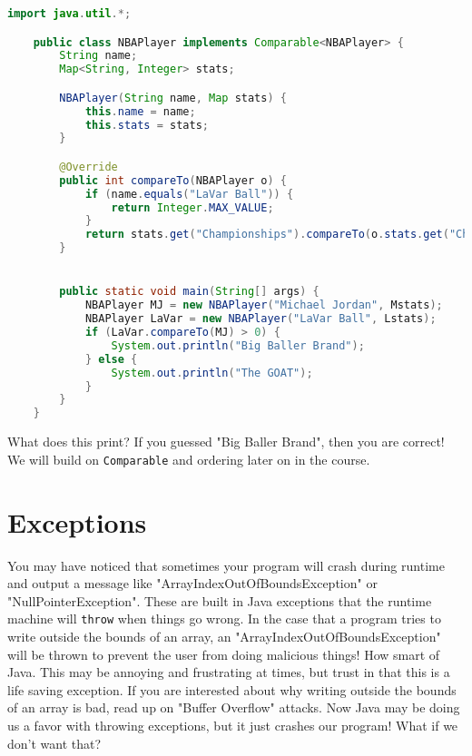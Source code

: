 \documentclass{article}
\begin{document}
    \begin{lstlisting}[language=Java]
    import java.util.*;

    public class NBAPlayer implements Comparable<NBAPlayer> {
        String name;
        Map<String, Integer> stats;

        NBAPlayer(String name, Map stats) {
            this.name = name;
            this.stats = stats;
        }

        @Override
        public int compareTo(NBAPlayer o) {
            if (name.equals("LaVar Ball")) {
                return Integer.MAX_VALUE;
            }
            return stats.get("Championships").compareTo(o.stats.get("Championships"));
        }


        public static void main(String[] args) {
            NBAPlayer MJ = new NBAPlayer("Michael Jordan", Mstats);
            NBAPlayer LaVar = new NBAPlayer("LaVar Ball", Lstats);
            if (LaVar.compareTo(MJ) > 0) {
                System.out.println("Big Baller Brand");
            } else {
                System.out.println("The GOAT");
            }
        }
    }
    \end{lstlisting}
What does this print? If you guessed "Big Baller Brand", then you are correct! We will build on \texttt{Comparable} and ordering later on in the course.

\section{Exceptions}
You may have noticed that sometimes your program will crash during runtime and output a message like "ArrayIndexOutOfBoundsException" or "NullPointerException". These are built in Java exceptions that the runtime machine will \texttt{throw} when things go wrong. In the case that a program tries to write outside the bounds of an array, an "ArrayIndexOutOfBoundsException" will be thrown to prevent the user from doing malicious things! How smart of Java. This may be annoying and frustrating at times, but trust in that this is a life saving exception. If you are interested about why writing outside the bounds of an array is bad, read up on "Buffer Overflow" attacks. Now Java may be doing us a favor with throwing exceptions, but it just crashes our program! What if we don't want that?
\end{document}
